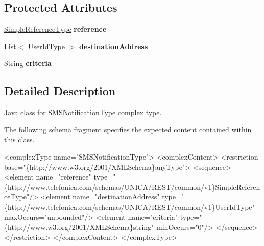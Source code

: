 \subsection*{Protected Attributes}
\begin{DoxyCompactItemize}
\item 
\hypertarget{classcom_1_1telefonica_1_1schemas_1_1unica_1_1rest_1_1sms_1_1v1_1_1SMSNotificationType_a4dfc890bb54ba5f0c277f4ae4f58c6e5}{
\hyperlink{classcom_1_1telefonica_1_1schemas_1_1unica_1_1rest_1_1common_1_1v1_1_1SimpleReferenceType}{SimpleReferenceType} {\bfseries reference}}
\label{classcom_1_1telefonica_1_1schemas_1_1unica_1_1rest_1_1sms_1_1v1_1_1SMSNotificationType_a4dfc890bb54ba5f0c277f4ae4f58c6e5}

\item 
\hypertarget{classcom_1_1telefonica_1_1schemas_1_1unica_1_1rest_1_1sms_1_1v1_1_1SMSNotificationType_a78283a6642546f8981b90a3c583aa567}{
List$<$ \hyperlink{classcom_1_1telefonica_1_1schemas_1_1unica_1_1rest_1_1common_1_1v1_1_1UserIdType}{UserIdType} $>$ {\bfseries destinationAddress}}
\label{classcom_1_1telefonica_1_1schemas_1_1unica_1_1rest_1_1sms_1_1v1_1_1SMSNotificationType_a78283a6642546f8981b90a3c583aa567}

\item 
\hypertarget{classcom_1_1telefonica_1_1schemas_1_1unica_1_1rest_1_1sms_1_1v1_1_1SMSNotificationType_ac5f82f239332c7223fb2eff2014bd345}{
String {\bfseries criteria}}
\label{classcom_1_1telefonica_1_1schemas_1_1unica_1_1rest_1_1sms_1_1v1_1_1SMSNotificationType_ac5f82f239332c7223fb2eff2014bd345}

\end{DoxyCompactItemize}


\subsection{Detailed Description}
Java class for \hyperlink{classcom_1_1telefonica_1_1schemas_1_1unica_1_1rest_1_1sms_1_1v1_1_1SMSNotificationType}{SMSNotificationType} complex type.

The following schema fragment specifies the expected content contained within this class.


\begin{DoxyPre}
 <complexType name="SMSNotificationType">
   <complexContent>
     <restriction base="\{http://www.w3.org/2001/XMLSchema\}anyType">
       <sequence>
         <element name="reference" type="\{http://www.telefonica.com/schemas/UNICA/REST/common/v1\}SimpleReferenceType"/>
         <element name="destinationAddress" type="\{http://www.telefonica.com/schemas/UNICA/REST/common/v1\}UserIdType" maxOccurs="unbounded"/>
         <element name="criteria" type="\{http://www.w3.org/2001/XMLSchema\}string" minOccurs="0"/>
       </sequence>
     </restriction>
   </complexContent>
 </complexType>
 \end{DoxyPre}
 

